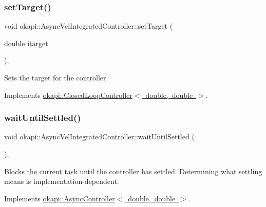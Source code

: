 \mbox{\label{classokapi_1_1AsyncVelIntegratedController_a5f1444ba57a64a21bfbdbdc57a264c2d}} 
\subsubsection{\texorpdfstring{setTarget()}{setTarget()}}
{\footnotesize\ttfamily void okapi\+::\+Async\+Vel\+Integrated\+Controller\+::set\+Target (\begin{DoxyParamCaption}\item[{double}]{itarget }\end{DoxyParamCaption})\hspace{0.3cm}{\ttfamily [override]}, {\ttfamily [virtual]}}

Sets the target for the controller. 

Implements \mbox{\hyperlink{classokapi_1_1ClosedLoopController_ac14482d0768b3f157d52e0214a4c36d7}{okapi\+::\+Closed\+Loop\+Controller$<$ double, double $>$}}.

\mbox{\label{classokapi_1_1AsyncVelIntegratedController_aa1a838d836496ca5565c1d8379c2897a}} 
\subsubsection{\texorpdfstring{waitUntilSettled()}{waitUntilSettled()}}
{\footnotesize\ttfamily void okapi\+::\+Async\+Vel\+Integrated\+Controller\+::wait\+Until\+Settled (\begin{DoxyParamCaption}{ }\end{DoxyParamCaption})\hspace{0.3cm}{\ttfamily [override]}, {\ttfamily [virtual]}}

Blocks the current task until the controller has settled. Determining what settling means is implementation-\/dependent. 

Implements \mbox{\hyperlink{classokapi_1_1AsyncController_a20e19f334e3dc7a3092e0e4355edcf49}{okapi\+::\+Async\+Controller$<$ double, double $>$}}.




